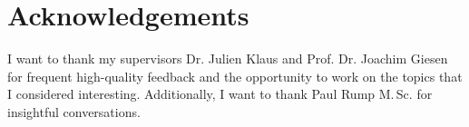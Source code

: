 \chapter{Acknowledgements}

I want to thank my supervisors Dr. Julien Klaus and Prof. Dr. Joachim Giesen
for frequent high-quality feedback
and the opportunity to work on the topics that I considered interesting.
Additionally, I want to thank Paul Rump M.\,Sc. for insightful conversations.